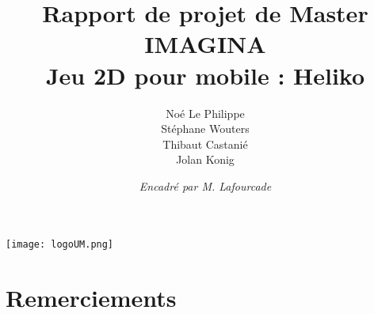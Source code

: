 \documentclass[a4paper,11pt]{article}
\begin{document}
\begin{center}
\texttt{[image: logoUM.png]}
\end{center}
\title{Rapport de projet de Master IMAGINA\\ \textbf{Jeu 2D pour mobile : Heliko}}
\author{Noé Le Philippe\\Stéphane Wouters\\Thibaut Castanié\\Jolan Konig}
\date{\textit{Encadré par M. Lafourcade}}

\maketitle
\thispagestyle{empty}

\newpage 

\thispagestyle{empty}
\section*{Remerciements}

\newpage

\setcounter{page}{3}
\tableofcontents

\newpage 



\newpage



\newpage



\newpage



\newpage



\newpage



\newpage


\end{document}
